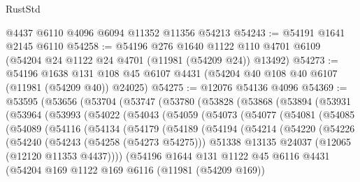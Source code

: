 \begin{lexlean}{RustStd}
\begin{coremodule}
    @4437
    @6110
    @4096
    @6094
    @11352
    @11356
    @54213
@54243 := @54191 @1641 @2145 @6110
@54258 := @54196
    @276
    @1640
    @1122
    @110
    @4701
    @6109
    (@54204 @24 @1122 @24 @4701 (@11981 (@54209 @24)) @13492)
@54273 := @54196
    @1638
    @131
    @108
    @45
    @6107
    @4431
    (@54204 @40 @108 @40 @6107 (@11981 (@54209 @40)) @24025)
@54275 := @12076 @54136 @4096
@54369 := @53595
    (@53656
      (@53704
        (@53747
          (@53780
            (@53828
              (@53868
                (@53894
                  (@53931
                    (@53964
                      (@53993
                        (@54022
                          (@54043
                            (@54059
                              (@54073
                                (@54077
                                  (@54081
                                    (@54085
                                      (@54089
                                        (@54116
                                          (@54134
                                            (@54179
                                              (@54189
                                                (@54194
                                                  (@54214
                                                    (@54220
                                                      (@54226
                                                        (@54240
                                                          (@54243 (@54258 (@54273 @54275)))
                                                          @51338
                                                          @13135
                                                          @24037
                                                          (@12065 (@12120 @11353 @4437))))
                                                      (@54196
                                                        @1644
                                                        @131
                                                        @1122
                                                        @45
                                                        @6116
                                                        @4431
                                                        (@54204
                                                          @169
                                                          @1122
                                                          @169
                                                          @6116
                                                          (@11981 (@54209 @169))

\end{coremodule}
\end{lexlean}
